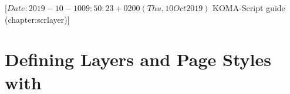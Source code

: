 %
%
%
%
%
%
%
%
% 
%
%
%
%

                 [$Date: 2019-10-10 09:50:23 +0200 (Thu, 10 Oct 2019) $
                  KOMA-Script guide (chapter:scrlayer)]



\chapter[{Defining Layers and Page Styles with \Package{scrlayer}}]
  {Defining Layers and Page Styles with
	}

